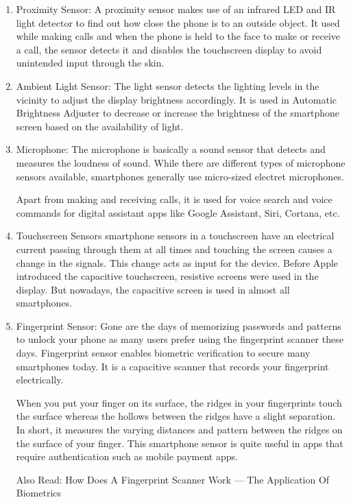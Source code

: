 \documentclass[12pt]{article}
\begin{document}
\begin{enumerate}
\item Proximity Sensor: A proximity sensor makes use of an infrared LED and IR light detector to find out how close the phone is to an outside object. It used while making calls and when the phone is held to the face to make or receive a call, the sensor detects it and disables the touchscreen display to avoid unintended input through the skin.

\item Ambient Light Sensor: The light sensor detects the lighting levels in the vicinity to adjust the display brightness accordingly. It is used in Automatic Brightness Adjuster to decrease or increase the brightness of the smartphone screen based on the availability of light.

\item Microphone: The microphone is basically a sound sensor that detects and measures the loudness of sound. While there are different types of microphone sensors available, smartphones generally use micro-sized electret microphones.

Apart from making and receiving calls, it is used for voice search and voice commands for digital assistant apps like Google Assistant, Siri, Cortana, etc.

\item Touchscreen Sensors smartphone sensors in a touchscreen have an electrical current passing through them at all times and touching the screen causes a change in the signals. This change acts as input for the device. Before Apple introduced the capacitive touchscreen, resistive screens were used in the display. But nowadays, the capacitive screen is used in almost all smartphones.

\item Fingerprint Sensor: Gone are the days of memorizing passwords and patterns to unlock your phone as many users prefer using the fingerprint scanner these days. Fingerprint sensor enables biometric verification to secure many smartphones today. It is a capacitive scanner that records your fingerprint electrically.

When you put your finger on its surface, the ridges in your fingerprints touch the surface whereas the hollows between the ridges have a slight separation. In short, it measures the varying distances and pattern between the ridges on the surface of your finger. This smartphone sensor is quite useful in apps that require authentication such as mobile payment apps.

    Also Read: How Does A Fingerprint Scanner Work — The Application Of Biometrics


\end{enumerate}
\end{document}
